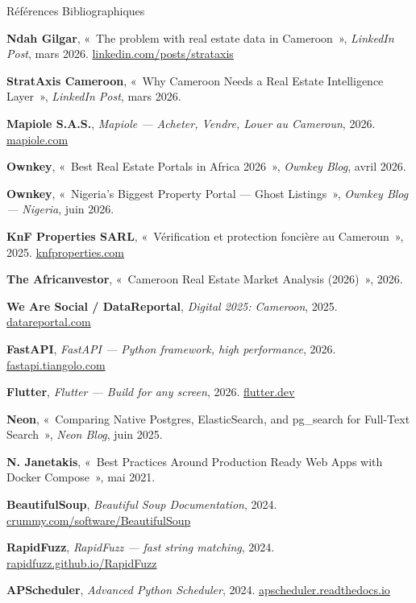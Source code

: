 \begin{frame}[allowframebreaks]{Références Bibliographiques}
  \footnotesize
  \begin{enumerate}[label={[\arabic*]}, leftmargin=0.8cm, itemsep=2pt]
    \item \textbf{Ndah Gilgar}, «~The problem with real estate data in Cameroon~», \textit{LinkedIn Post}, mars 2026. \url{linkedin.com/posts/strataxis}
    \item \textbf{StratAxis Cameroon}, «~Why Cameroon Needs a Real Estate Intelligence Layer~», \textit{LinkedIn Post}, mars 2026.
    \item \textbf{Mapiole S.A.S.}, \textit{Mapiole — Acheter, Vendre, Louer au Cameroun}, 2026. \url{mapiole.com}
    \item \textbf{Ownkey}, «~Best Real Estate Portals in Africa 2026~», \textit{Ownkey Blog}, avril 2026.
    \item \textbf{Ownkey}, «~Nigeria's Biggest Property Portal — Ghost Listings~», \textit{Ownkey Blog — Nigeria}, juin 2026.
    \item \textbf{KnF Properties SARL}, «~Vérification et protection foncière au Cameroun~», 2025. \url{knfproperties.com}
    \item \textbf{The Africanvestor}, «~Cameroon Real Estate Market Analysis (2026)~», 2026.
    \item \textbf{We Are Social / DataReportal}, \textit{Digital 2025: Cameroon}, 2025. \url{datareportal.com}
    \item \textbf{FastAPI}, \textit{FastAPI — Python framework, high performance}, 2026. \url{fastapi.tiangolo.com}
    \item \textbf{Flutter}, \textit{Flutter — Build for any screen}, 2026. \url{flutter.dev}
    \item \textbf{Neon}, «~Comparing Native Postgres, ElasticSearch, and pg\_search for Full-Text Search~», \textit{Neon Blog}, juin 2025.
    \item \textbf{N. Janetakis}, «~Best Practices Around Production Ready Web Apps with Docker Compose~», mai 2021.
    \item \textbf{BeautifulSoup}, \textit{Beautiful Soup Documentation}, 2024. \url{crummy.com/software/BeautifulSoup}
    \item \textbf{RapidFuzz}, \textit{RapidFuzz — fast string matching}, 2024. \url{rapidfuzz.github.io/RapidFuzz}
    \item \textbf{APScheduler}, \textit{Advanced Python Scheduler}, 2024. \url{apscheduler.readthedocs.io}

\end{enumerate}
\end{frame}
